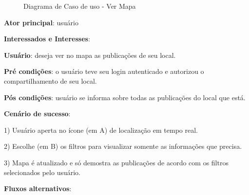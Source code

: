 \documentclass[12pt]{article}
\begin{document}
  \begin{figure}[!htb]
    \caption{\label{fig:diagUseCase02} Diagrama de Caso de uso - Ver Mapa}
  \end{figure}

\textbf{Ator principal}: usuário

\textbf{Interessados e Interesses}:

\textbf{Usuário}: deseja ver no mapa as publicações de seu local.

\textbf{Pré condições}: o usuário teve seu login autenticado e autorizou o compartilhamento de seu local.

\textbf{Pós condições}: usuário se informa sobre todas as publicações do local que está.

\textbf{Cenário de sucesso}:

1) Usuário aperta no ícone (em A) de localização em tempo real.

2) Escolhe (em B) os filtros para visualizar somente as informações que precisa.

3) Mapa é atualizado e só demostra as publicações de acordo com os filtros selecionados pelo usuário.

\textbf{Fluxos alternativos}:
\end{document}
